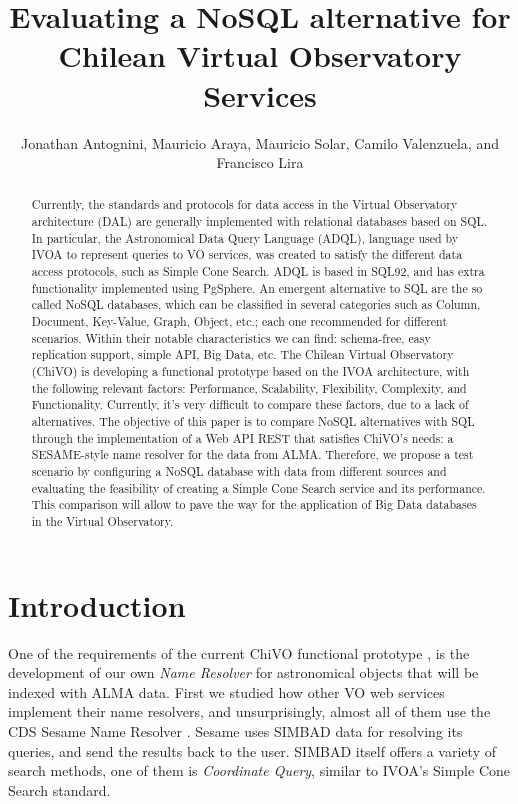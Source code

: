 \documentclass[11pt,twoside]{article}
\begin{document}
\title{Evaluating a NoSQL alternative for Chilean Virtual Observatory Services}
\author{Jonathan Antognini,  Mauricio Araya, Mauricio Solar, Camilo Valenzuela, and  Francisco Lira
}

\begin{abstract}
Currently, the standards and protocols for data access in the Virtual Observatory architecture (DAL) are generally implemented with
relational databases based on SQL. In particular, the Astronomical Data Query Language (ADQL), language used by IVOA to represent 
queries to VO services, was created to satisfy the different data access protocols, such as Simple Cone Search. ADQL is based in 
SQL92, and has extra functionality implemented using PgSphere. An emergent alternative to SQL are the so called NoSQL databases, 
which can be classified in several categories such as Column, Document, Key-Value, Graph, Object, etc.; each one recommended for 
different scenarios. Within their notable characteristics we can find: schema-free, easy replication support, simple API, Big Data,
etc. The Chilean Virtual Observatory (ChiVO) is developing a functional prototype based on the IVOA architecture, with the following
relevant factors: Performance, Scalability, Flexibility, Complexity, and Functionality. Currently, it's very difficult to compare 
these factors, due to a lack of alternatives. The objective of this paper is to compare NoSQL alternatives with SQL through the 
implementation of a Web API REST that satisfies ChiVO's needs: a SESAME-style name resolver for the data from ALMA. Therefore, 
we propose a test scenario by configuring a NoSQL database with data from different sources and evaluating the feasibility of 
creating a Simple Cone Search service and its performance. This comparison will allow to pave the way for the application of 
Big Data databases in the Virtual Observatory.
\end{abstract}

\section{Introduction}
One of the requirements of the current ChiVO functional prototype
\cite{Antognini2013}, is the development of our own \emph{Name Resolver}
for astronomical objects that will be indexed with ALMA data. 
First we studied how other VO web services implement their name 
resolvers, and unsurprisingly, almost all of them use the CDS Sesame Name
Resolver \cite{}. 
Sesame uses SIMBAD data for resolving its queries, and send the results
back to the user.
SIMBAD itself offers a variety of search methods, one of them is
\emph{Coordinate Query}, similar to IVOA’s Simple Cone Search standard.
\end{document}

